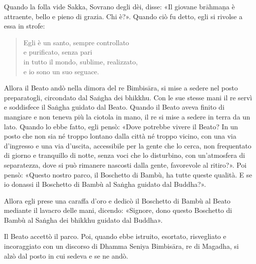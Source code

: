 Quando la folla vide Sakka, Sovrano degli dèi, disse: «Il giovane
brāhmaṇa è attraente, bello e pieno di grazia. Chi è?». Quando ciò fu
detto, egli si rivolse a essa in strofe:


\begin{quote}
Egli è un santo, sempre controllato \\
e purificato, senza pari \\
in tutto il mondo, sublime, realizzato, \\
e io sono un suo seguace.
\end{quote}

Allora il Beato andò nella dimora del re Bimbisāra, si mise a sedere nel
posto preparatogli, circondato dal Saṅgha dei bhikkhu. Con le sue stesse
mani il re servì e soddisfece il Saṅgha guidato dal Beato. Quando il
Beato aveva finito di mangiare e non teneva più la ciotola in mano, il
re si mise a sedere in terra da un lato. Quando lo ebbe fatto, egli
pensò: «Dove potrebbe vivere il Beato? In un posto che non sia né troppo
lontano dalla città né troppo vicino, con una via d’ingresso e una via
d’uscita, accessibile per la gente che lo cerca, non frequentato di
giorno e tranquillo di notte, senza voci che lo disturbino, con
un’atmosfera di separatezza, dove si può rimanere nascosti dalla gente,
favorevole al ritiro?». Poi pensò: «Questo nostro parco, il Boschetto di
Bambù, ha tutte queste qualità. E se io donassi il Boschetto di Bambù al
Saṅgha guidato dal Buddha?».


Allora egli prese una caraffa d’oro e dedicò il Boschetto di Bambù al
Beato mediante il lavacro delle mani, dicendo: «Signore, dono questo
Boschetto di Bambù al Saṅgha dei bhikkhu guidato dal Buddha».


Il Beato accettò il parco. Poi, quando ebbe istruito, esortato,
risvegliato e incoraggiato con un discorso di Dhamma Seniya Bimbisāra,
re di Magadha, si alzò dal posto in cui sedeva e se ne andò.




